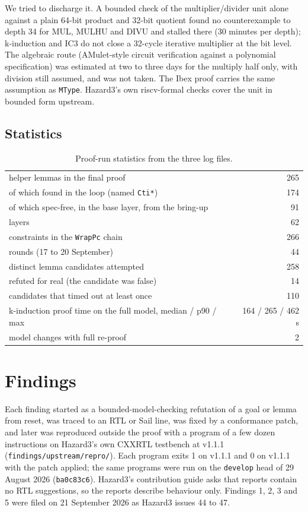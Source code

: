 \documentclass[11pt]{article}
\newcommand{\code}[1]{\texttt{#1}}
\begin{document}
We tried to discharge it. A bounded check of the multiplier/divider unit
alone against a plain 64-bit product and 32-bit quotient found no
counterexample to depth 34 for MUL, MULHU and DIVU and stalled there (30
minutes per depth); k-induction and IC3 do not close a 32-cycle iterative
multiplier at the bit level. The algebraic route (AMulet-style circuit
verification against a polynomial specification) was estimated at two to three
days for the multiply half only, with division still assumed, and was not
taken. The Ibex proof carries the same assumption as \code{MType}. Hazard3's
own riscv-formal checks cover the unit in bounded form upstream.

\subsection{Statistics}

\begin{table}[h]
\centering
\small
\begin{tabular}{lr}
\toprule
helper lemmas in the final proof & 265 \\
\quad of which found in the loop (named \code{Cti*}) & 174 \\
\quad of which spec-free, in the base layer, from the bring-up & 91 \\
layers & 62 \\
constraints in the \code{WrapPc} chain & 266 \\
rounds (17 to 20 September) & 44 \\
distinct lemma candidates attempted & 258 \\
refuted for real (the candidate was false) & 14 \\
candidates that timed out at least once & 110 \\
k-induction proof time on the full model, median / p90 / max & 164 / 265 / 462 s \\
model changes with full re-proof & 2 \\
\bottomrule
\end{tabular}
\caption{Proof-run statistics from the three log files.}
\end{table}

\section{Findings}
\label{sec:findings}

Each finding started as a bounded-model-checking refutation of a goal or lemma
from reset, was traced to an RTL or Sail line, was fixed by a conformance
patch, and later was reproduced outside the proof with a program of a few
dozen instructions on Hazard3's own CXXRTL testbench at v1.1.1
(\code{findings/upstream/repro/}). Each program exits 1 on v1.1.1 and 0 on
v1.1.1 with the patch applied; the same programs were run on the \code{develop}
head of 29 August 2026 (\code{ba0c83c6}). Hazard3's contribution guide asks
that reports contain no RTL suggestions, so the reports describe behaviour
only. Findings 1, 2, 3 and 5 were filed on 21 September 2026 as Hazard3
issues 44 to 47.
\end{document}
